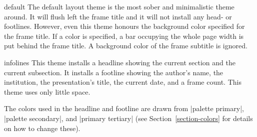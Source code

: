 \begin{outerthemeexample}{default}
  The default layout theme is the most sober and minimalistic theme around. It will flush left the frame title and it will not install any head- or footlines. However, even this theme honours the background color specified for the frame title. If a color is specified, a bar occupying the whole page width is put behind the frame title. A background color of the frame subtitle is ignored.
\end{outerthemeexample}

\begin{outerthemeexample}{infolines}
  This theme installs a headline showing the current section and the current subsection. It installs a footline showing the author's name, the institution, the presentation's title, the current date, and a frame count. This theme uses only little space.

  The colors used in the headline and footline are drawn from |palette primary|, |palette secondary|, and |primary tertiary| (see Section~\ref{section-colors} for details on how to change these).
\end{outerthemeexample}

